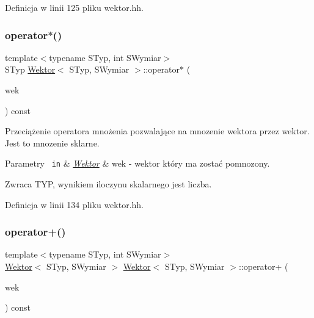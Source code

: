 Definicja w linii 125 pliku wektor.\+hh.

\mbox{\label{class_wektor_a80cfd984612acba04ac3daa26549ca64}} 
\subsubsection{\texorpdfstring{operator$\ast$()}{operator*()}\hspace{0.1cm}{\footnotesize\ttfamily [2/2]}}
{\footnotesize\ttfamily template$<$typename S\+Typ, int S\+Wymiar$>$ \\
S\+Typ \mbox{\hyperlink{class_wektor}{Wektor}}$<$ S\+Typ, S\+Wymiar $>$\+::operator$\ast$ (\begin{DoxyParamCaption}\item[{const \mbox{\hyperlink{class_wektor}{Wektor}}$<$ S\+Typ, S\+Wymiar $>$ \&}]{wek }\end{DoxyParamCaption}) const}

Przeciążenie operatora mnożenia pozwalające na mnozenie wektora przez wektor. Jest to mnozenie sklarne.


\begin{DoxyParams}[1]{Parametry}
\mbox{\texttt{ in}}  & {\em \mbox{\hyperlink{class_wektor}{Wektor}}} & wek -\/ wektor który ma zostać pomnozony. \\
\hline
\end{DoxyParams}
\begin{DoxyReturn}{Zwraca}
T\+YP, wynikiem iloczynu skalarnego jest liczba. 
\end{DoxyReturn}


Definicja w linii 134 pliku wektor.\+hh.

\mbox{\label{class_wektor_a08bbabfe97cf0699429571b6eed21ed8}} 
\subsubsection{\texorpdfstring{operator+()}{operator+()}}
{\footnotesize\ttfamily template$<$typename S\+Typ, int S\+Wymiar$>$ \\
\mbox{\hyperlink{class_wektor}{Wektor}}$<$ S\+Typ, S\+Wymiar $>$ \mbox{\hyperlink{class_wektor}{Wektor}}$<$ S\+Typ, S\+Wymiar $>$\+::operator+ (\begin{DoxyParamCaption}\item[{const \mbox{\hyperlink{class_wektor}{Wektor}}$<$ S\+Typ, S\+Wymiar $>$ \&}]{wek }\end{DoxyParamCaption}) const}

